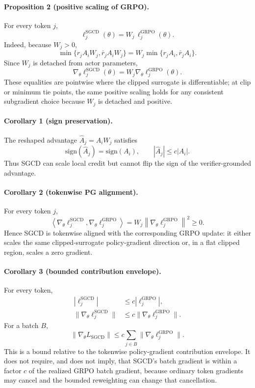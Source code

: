 \paragraph{Proposition 2 (positive scaling of GRPO).}
For every token $j$,
\[
  \ell_j^{\mathrm{SGCD}}(\theta)
  =
  W_j\,\ell_j^{\mathrm{GRPO}}(\theta).
\]
Indeed, because $W_j>0$,
\[
  \min\{r_jA_iW_j,\bar r_jA_iW_j\}
  =
  W_j\min\{r_jA_i,\bar r_jA_i\}.
\]
Since $W_j$ is detached from actor parameters,
\[
  \nabla_\theta \ell_j^{\mathrm{SGCD}}(\theta)
  =
  W_j\nabla_\theta \ell_j^{\mathrm{GRPO}}(\theta).
\]
These equalities are pointwise where the clipped surrogate is differentiable;
at clip or minimum tie points, the same positive scaling holds for any
consistent subgradient choice because $W_j$ is detached and positive.

\paragraph{Corollary 1 (sign preservation).}
The reshaped advantage $\widehat A_j=A_iW_j$ satisfies
\[
  \mathrm{sign}(\widehat A_j)=\mathrm{sign}(A_i),
  \qquad
  |\widehat A_j|\le c|A_i|.
\]
Thus SGCD can scale local credit but cannot flip the sign of the
verifier-grounded advantage.

\paragraph{Corollary 2 (tokenwise PG alignment).}
For every token $j$,
\[
  \left\langle
  \nabla_\theta \ell_j^{\mathrm{SGCD}},
  \nabla_\theta \ell_j^{\mathrm{GRPO}}
  \right\rangle
  =
  W_j
  \left\|
  \nabla_\theta \ell_j^{\mathrm{GRPO}}
  \right\|^2
  \ge 0.
\]
Hence SGCD is tokenwise aligned with the corresponding GRPO update: it either
scales the same clipped-surrogate policy-gradient direction or, in a flat
clipped region, scales a zero gradient.

\paragraph{Corollary 3 (bounded contribution envelope).}
For every token,
\[
  \begin{aligned}
  |\ell_j^{\mathrm{SGCD}}|
  &\le c|\ell_j^{\mathrm{GRPO}}|,\\
  \|\nabla_\theta \ell_j^{\mathrm{SGCD}}\|
  &\le c\|\nabla_\theta \ell_j^{\mathrm{GRPO}}\|.
  \end{aligned}
\]
For a batch $B$,
\[
  \|\nabla_\theta L_{\mathrm{SGCD}}\|
  \le
  c\sum_{j\in B}
  \|\nabla_\theta \ell_j^{\mathrm{GRPO}}\|.
\]
This is a bound relative to the tokenwise policy-gradient contribution
envelope. It does not require, and does not imply, that SGCD's batch gradient is
within a factor $c$ of the realized GRPO batch gradient, because ordinary token
gradients may cancel and the bounded reweighting can change that cancellation.

